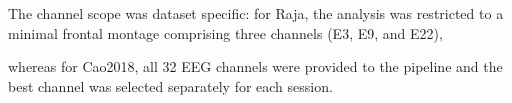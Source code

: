 The channel scope was dataset specific: for Raja, the analysis was restricted to a minimal frontal montage comprising three channels (E3, E9, and E22),


whereas for Cao2018, all 32 EEG channels were provided to the pipeline and the best channel was selected separately for each session.
